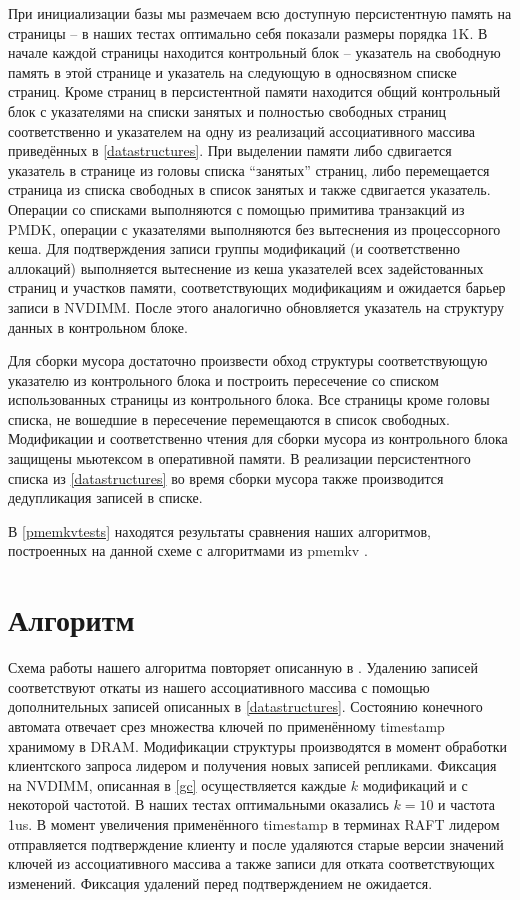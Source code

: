 \documentclass[pdftex,ptm,12pt,a4paper]{report}
\theoremstyle{definition}
\begin{document}
При инициализации базы мы размечаем всю доступную персистентную память на страницы -- в наших тестах оптимально себя показали размеры порядка 1K.
В начале каждой страницы находится контрольный блок -- указатель на свободную память в этой странице и указатель на следующую в односвязном списке страниц.
Кроме страниц в персистентной памяти находится общий контрольный блок с указателями на списки занятых и полностью свободных страниц соответственно и
указателем на одну из реализаций ассоциативного массива приведённых в \ref{datastructures}. При выделении памяти либо сдвигается указатель в странице из головы списка ``занятых''
страниц, либо перемещается страница из списка свободных в список занятых и также сдвигается указатель. Операции со списками выполняются с помощью примитива транзакций из PMDK, операции
с указателями выполняются без вытеснения из процессорного кеша. Для подтверждения записи группы модификаций (и соответственно аллокаций) выполняется вытеснение из кеша указателей
всех задейстованных страниц и участков памяти, соответствующих модификациям и ожидается барьер записи в NVDIMM. После этого аналогично обновляется указатель на структуру данных в
контрольном блоке.

Для сборки мусора достаточно произвести обход структуры соответствующую указателю из контрольного блока и построить пересечение со списком использованных страницы из контрольного блока.
Все страницы кроме головы списка, не вошедшие в пересечение перемещаются в список свободных. Модификации и соответственно чтения для сборки мусора из контрольного блока защищены
мьютексом в оперативной памяти. В реализации персистентного списка из \ref{datastructures} во время сборки мусора также производится дедупликация записей в списке.

В \ref{pmemkvtests} находятся результаты сравнения наших алгоритмов, построенных на данной схеме с алгоритмами из pmemkv \cite{pmemkv}.

\section{Алгоритм}
Схема работы нашего алгоритма повторяет описанную в \cite{raftpaper}. Удалению записей соответствуют откаты из нашего ассоциативного массива с помощью дополнительных записей описанных в \ref{datastructures}. Состоянию конечного автомата отвечает срез множества ключей по применённому timestamp хранимому в DRAM. Модификации структуры производятся в момент обработки
клиентского запроса лидером и получения новых записей репликами. Фиксация на NVDIMM, описанная в \ref{gc} осуществляется каждые $k$ модификаций и с некоторой частотой.
В наших тестах оптимальными оказались $k=10$ и частота 1us. В момент увеличения применённого timestamp в терминах RAFT лидером отправляется подтверждение клиенту и после удаляются
старые версии значений ключей из ассоциативного массива а также записи для отката соответствующих изменений. Фиксация удалений перед подтверждением не ожидается.
\end{document}

